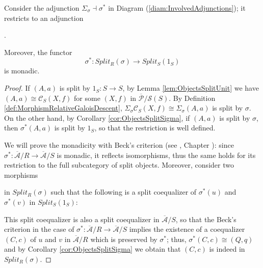 \begin{lemma}
\label{lem:PullbackMonadicSplitCategory}
    Consider the adjunction $\Sigma_\sigma\dashv\sigma^*$ in Diagram (\ref{diam:InvolvedAdjunctions}); it restricts to an adjunction
    \begin{center}
        .
    \end{center}
    Moreover, the functor
    \[\sigma^*:Split_R(\sigma)\longrightarrow Split_S(1_S)\]
    is monadic.
    \begin{proof}
        If $(A,a)$ is split by $1_S:S\to S$, by Lemma \ref{lem:ObjectsSplitUnit} we have $(A,a)\cong\mathcal{C}_S(X,f)$ for some $(X,f)$ in $\overline{\mathcal{P}}/\mathcal{S}(S)$. By Definition \ref{def:MorphismRelativeGaloisDescent}, $\Sigma_\sigma\mathcal{C}_S(X,f)\cong\Sigma_\sigma(A,a)$ is split by $\sigma$. On the other hand, by Corollary \ref{cor:ObjectsSplitSigma}, if $(A,a)$ is split by $\sigma$, then $\sigma^*(A,a)$ is split by $1_S$, so that the restriction is well defined.

        We will prove the monadicity with Beck's criterion (see \cite{pedicchio2004categoricalV}, Chapter ): since $\sigma^*:\overline{\mathcal{A}}/R\longrightarrow\overline{\mathcal{A}}/S$ is monadic, it reflects isomorphisms, thus the same holds for its restriction to the full subcategory of split objects. Moreover, consider two morphisms 
        in $Split_R(\sigma)$ such that the following is a split coequalizer of $\sigma^*(u)$ and $\sigma^*(v)$ in $Split_S(1_S)$:
        \begin{center}
        \end{center}

        This split coequalizer is also a split coequalizer in $\overline{\mathcal{A}}/S$, so that the Beck's criterion in the case of $\sigma^*:\overline{\mathcal{A}}/R\longrightarrow\overline{\mathcal{A}}/S$ implies the existence of a coequalizer $(C,c)$ of $u$ and $v$ in $\overline{\mathcal{A}}/R$ which is preserved by $\sigma^*$; thus, $\sigma^*(C,c)\cong(Q,q)$ and by Corollary \ref{cor:ObjectsSplitSigma} we obtain that $(C,c)$ is indeed in $Split_R(\sigma)$.
    \end{proof}
\end{lemma}
